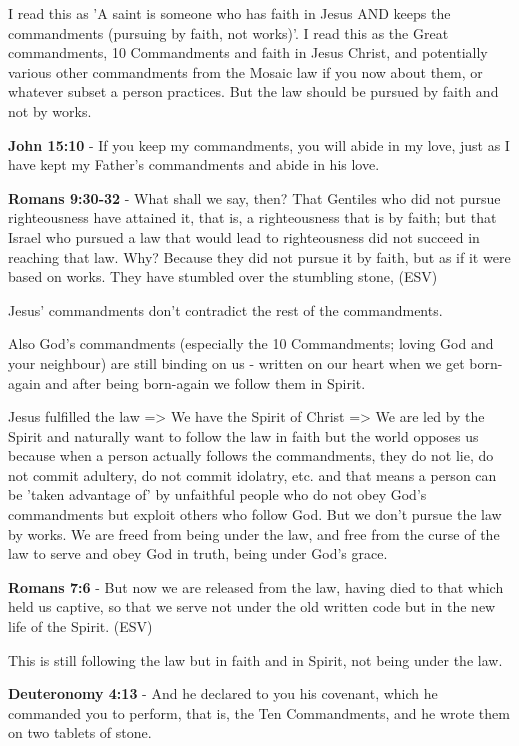 \documentclass[11pt]{article}
\begin{document}
I read this as 'A saint is someone who has faith in Jesus AND keeps the commandments (pursuing by faith, not works)'.
I read this as the Great commandments, 10 Commandments and faith in Jesus Christ, and potentially various other commandments from the Mosaic law if you now about them, or whatever subset a person practices.
But the law should be pursued by faith and not by works.

\textbf{John 15:10} - If you keep my commandments, you will abide in my love, just as I have kept my Father's commandments and abide in his love.

\textbf{Romans 9:30-32} - What shall we say, then? That Gentiles who did not pursue righteousness have attained it, that is, a righteousness that is by faith; but that Israel who pursued a law that would lead to righteousness did not succeed in reaching that law. Why? Because they did not pursue it by faith, but as if it were based on works. They have stumbled over the stumbling stone, (ESV)

Jesus' commandments don't contradict the rest of the commandments.

Also God's commandments (especially the 10 Commandments; loving God and your neighbour) are still binding on us - written on our heart when we get born-again and after being born-again we follow them in Spirit.

Jesus fulfilled the law => We have the Spirit of Christ => We are led by the Spirit and naturally want to follow the law in faith but the world opposes us because when a person actually follows the commandments, they do not lie, do not commit adultery, do not commit idolatry, etc. and that means a person can be 'taken advantage of' by unfaithful people who do not obey God's commandments but exploit others who follow God.
But we don't pursue the law by works. We are freed from being under the law, and free from the curse of the law to serve and obey God in truth, being under God's grace.

\textbf{Romans 7:6} -  But now we are released from the law, having died to that which held us captive, so that we serve not under the old written code but in the new life of the Spirit.  (ESV)

This is still following the law but in faith and in Spirit, not being under the law.

\textbf{Deuteronomy 4:13} - And he declared to you his covenant, which he commanded you to perform, that is, the Ten Commandments, and he wrote them on two tablets of stone.
\end{document}
